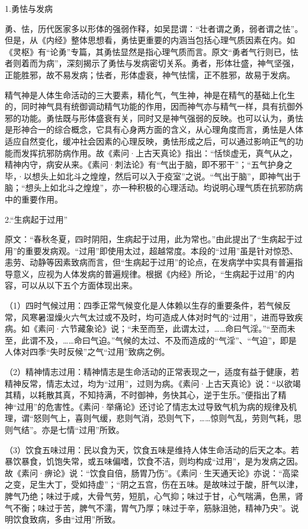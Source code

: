 \documentclass[12pt]{ctexbook}
\begin{document}

1.勇怯与发病

勇、怯，历代医家多以形体的强弱作释，如吴昆谓：“壮者谓之勇，弱者谓之怯”。但是，从《内经》整体思想看，勇怯更重要的内涵当包括心理气质因素在内。如《灵枢》有“论勇”专篇，其勇怯显然是指心理气质而言。原文“勇者气行则已，怯者则着而为病”，深刻揭示了勇怯与发病密切关系。勇者，形体壮盛，神气坚强，正能胜邪，故不易发病；怯者，形体虚衰，神气怯懦，正不胜邪，故易于发病。

精气神是人体生命活动的三大要素，精化气，气生神，神是在精气的基础上化生的，同时神气具有统御调动精气功能的作用，因而神气亦与精气一样，具有抗御外邪的功能。勇怯既与形体盛衰有关，同时又是神气强弱的反映。也可以认为，勇怯是形神合一的综合概念，它具有心身两方面的含义，从心理角度而言，勇怯是人体适应自然变化，缓冲社会因素的心理反映，勇怯形成之后，可以通过影响正气的功能而发挥抗邪防病作用。故《素问·上古天真论》指出：“恬惔虚无，真气从之，精神内守，病安从来。《素问·刺法论》有“气出于脑，即不邪干”；“五气护身之毕，·以想头上如北斗之煌煌，然后可以入于疫室”之说。“气出于脑”，即神气出于脑；“想头上如北斗之煌煌”，亦一种积极的心理活动。均说明心理气质在抗邪防病中的重要作用。

2.“生病起于过用”

原文：“春秋冬夏，四时阴阳，生病起于过用，此为常也。”由此提出了“生病起于过用”的重要发病观。“过用”即使用太过，超越常度。本段的“过用”虽是针对惊恐、恚劳、动静等因素致病而言，但“生病起于过用”的论点，在发病学中实具有普遍指导意义，应视为人体发病的普遍规律。根据《内经》所论，“生病起于过用”的内容，可以从以下五个方面体现出来。

（1）四时气候过用：四季正常气候变化是人体赖以生存的重要条件，若气候反常，风寒暑湿燥火六气太过或不及时，均可造成人体对时气的“过用”，进而导致疾病。如《素问·六节藏象论》说；“未至而至，此谓太过，……命曰气淫。”“至而未至，此谓不及，……命曰气迫。”气候的太过、不及而造成的“气淫”、“气迫”，即是人体对四季“失时反候”之气“过用”致病之例。

（2）精神情志过用：精神情志是生命活动的正常表现之一，适度有益于健康，若精神反常，情志太过，均为“过用”，过则为病。《素问·上古天真论》说：“以欲竭其精，以耗散其真，不知持满，不时御神，务快其心，逆于生乐。”便指出了精神“过用”的危害性。《素问·举痛论》还讨论了情志太过导致气机为病的规律及机理，谓“怒则气上，喜则气缓，悲则气消，恐则气下，……惊则气乱，劳则气耗，思则气结”。亦是七情“过用”所致。

（3）饮食五味过用：民以食为天，饮食五味是维持人体生命活动的后天之本。若暴饮暴食，饥饱失常，或五味偏嗜，饮食不洁，则均构成“过用”，是为发病之因。故《素问·痹论》说：“饮食自倍，肠胃乃伤”。《素问·生天通天论》亦说：“高梁之变，足生大丁，受如持虚”；“阴之五宫，伤在五味。是故味过于酸，肝气以津，脾气乃绝；味过于咸，大骨气劳，短肌，心气抑；味过于甘，心气喘满，色黑，肾气不衡；味过于苦，脾气不濡，胃气乃厚；味过于辛，筋脉沮弛，精神乃央”。说明饮食致病，多由“过用”所致。
\end{document}
